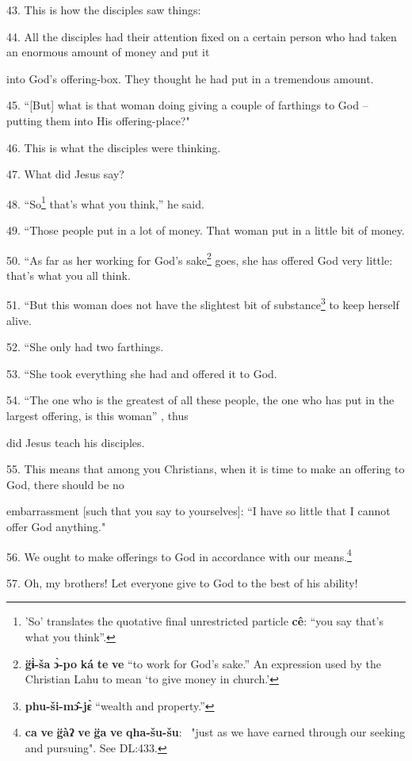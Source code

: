 43. This is how the disciples saw things:

44. All the disciples had their attention fixed on a certain person who had taken
an enormous amount of money and put it

into God's offering-box. They thought he had put in a tremendous amount.

45. ``[But] what is that woman doing giving a couple of farthings to God
-- putting them into His offering-place?"

46. This is what the disciples were thinking.

47. What did Jesus say?

48. ``So\footnote{'So' translates the quotative final unrestricted particle \textbf{cê}: ``you say that's what you think''.} that's what you think,'' he said.

49. ``Those people put in a lot of money. That woman put in a little bit
of money.

50. ``As far as her working for God's sake\footnote{\textbf{g̈ɨ̀-ša} \textbf{ɔ̀-po} \textbf{ká} \textbf{te} \textbf{ve} ``to work for God's sake.'' An expression used by the Christian Lahu to mean `to give money in church.'} goes, she has offered God
very little: that's what you all think.

51. ``But this woman does not have the slightest bit of substance\footnote{\textbf{phu-ši-mɔ̂-jɛ̀} ``wealth and property.''} to
keep herself alive.

52. ``She only had two farthings.

53. ``She took everything she had and offered it to God.

54. ``The one who is the greatest of all these people, the one who has put
in the largest offering, is this woman'' , thus

did Jesus teach his disciples.

55. This means that among you Christians, when it is time to make an offering to
God, there should be no

embarrassment [such that you say to yourselves]: ``I have so little that
I cannot offer God anything."

56. We ought to make offerings to God in accordance with our means.\footnote{\textbf{ca} \textbf{ve} \textbf{g̈àʔ} \textbf{ve} \textbf{g̈a} \textbf{ve} \textbf{qha-šu-šu}: ~"just as we have earned through our seeking and pursuing". See DL:433.}

57. Oh, my brothers! Let everyone give to God to the best of his ability!

